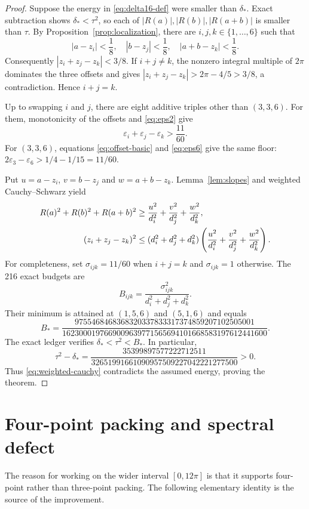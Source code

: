 \documentclass[11pt,reqno]{amsart}
\theoremstyle{definition}
\theoremstyle{remark}
\newcommand{\eps}{\varepsilon}
\begin{document}
\begin{proof}
Suppose the energy in \eqref{eq:delta16-def} were smaller than $\delta_*$.
Exact subtraction shows $\delta_*<\tau^2$, so each of
$|R(a)|,|R(b)|,|R(a+b)|$ is smaller than $\tau$.  By
Proposition~\ref{prop:localization}, there are $i,j,k\in\{1,\ldots,6\}$
such that
\[
 |a-z_i|<\frac18,\quad |b-z_j|<\frac18,
 \quad |a+b-z_k|<\frac18.
\]
Consequently $|z_i+z_j-z_k|<3/8$.  If $i+j\ne k$, the nonzero integral
multiple of $2\pi$ dominates the three offsets and gives
$|z_i+z_j-z_k|>2\pi-4/5>3/8$, a contradiction.  Hence $i+j=k$.

Up to swapping $i$ and $j$, there are eight additive triples other than
$(3,3,6)$.  For them, monotonicity of the offsets and \eqref{eq:eps2} give
\[
 \eps_i+\eps_j-\eps_k>\frac{11}{60}.
\]
For $(3,3,6)$, equations \eqref{eq:offset-basic} and \eqref{eq:eps6} give
the same floor:
$2\eps_3-\eps_6>1/4-1/15=11/60$.

Put $u=a-z_i$, $v=b-z_j$ and $w=a+b-z_k$.  Lemma~\ref{lem:slopes} and
weighted Cauchy--Schwarz yield
\begin{align}\label{eq:weighted-cauchy}
 R(a)^2+R(b)^2+R(a+b)^2
 &\ge \frac{u^2}{d_i^2}+\frac{v^2}{d_j^2}+\frac{w^2}{d_k^2},\\
 (z_i+z_j-z_k)^2
 &\le(d_i^2+d_j^2+d_k^2)
 \left(\frac{u^2}{d_i^2}+\frac{v^2}{d_j^2}
 +\frac{w^2}{d_k^2}\right).\notag
\end{align}
For completeness, set $\sigma_{ijk}=11/60$ when $i+j=k$ and
$\sigma_{ijk}=1$ otherwise.  The 216 exact budgets are
\[
 B_{ijk}=\frac{\sigma_{ijk}^2}{d_i^2+d_j^2+d_k^2}.
\]
Their minimum is attained at $(1,5,6)$ and $(5,1,6)$ and equals
\begin{equation}\label{eq:budget-min}
 B_*=
 \frac{9755468468368320337833317374859207102505001}
 {1623000197669009639771565694101668583197612441600}.
\end{equation}
The exact ledger verifies $\delta_*<\tau^2<B_*$.  In particular,
\[
 \tau^2-\delta_*
 =\frac{35399897577222712511}
 {32651991661090957509227042221277500}>0.
\]
Thus \eqref{eq:weighted-cauchy} contradicts the assumed energy, proving the
theorem.
\end{proof}

\section{Four-point packing and spectral defect}\label{sec:four-point}

The reason for working on the wider interval $[0,12\pi]$ is that it supports
four-point rather than three-point packing.  The following elementary
identity is the source of the improvement.
\end{document}
